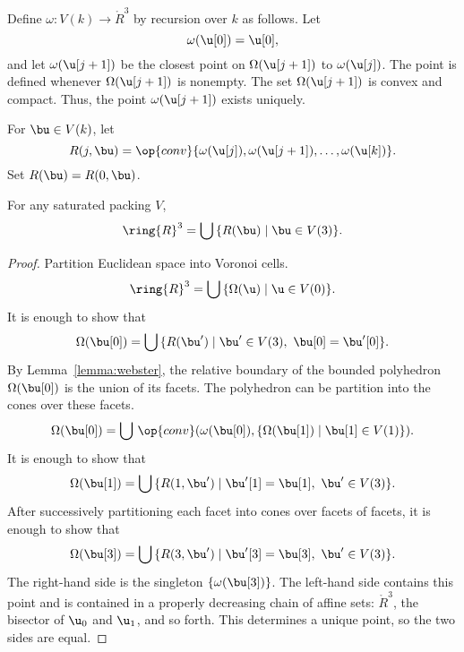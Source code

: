 Define $\omega: V(k)\to \ring{R}^3$ by recursion over $k$ as follows.
Let \begin{displaymath}\omega( \u[0]) = \u[0],\end{displaymath} and
let $\omega( \u[j+1])$ be the closest point on $\Omega( \u[j+1])$ to
$\omega( \u[j])$.  The point is defined whenever $\Omega( \u[j+1])$ is
nonempty.  The set $\Omega( \u[j+1])$ is convex and compact.  Thus,
the point $\omega( \u[j+1])$ exists uniquely.
%

For $\bu\in V(k)$, let 
\begin{displaymath}R(j,\bu) = \op{conv}\{\omega( \u[j]), \omega(
\u[j+1]),\ldots,\omega( \u[k])\}.\end{displaymath} Set
$R(\bu)=R(0,\bu)$.  %


\begin{lemma}
For any saturated packing $ V$, 
\begin{displaymath}\ring{R}^3 = \bigcup\, \{ R(\bu) \mid \bu\in
V(3)\}.\end{displaymath}
\end{lemma}

\begin{proof}
Partition Euclidean space into Voronoi cells. 
\begin{displaymath}\ring{R}^3 = \bigcup\, \{\Omega( \u)\mid \u\in
V(0)\}.\end{displaymath}
It is enough to show that
\begin{displaymath}\Omega(\bu[0]) = \bigcup\, \{ R(\bu') \mid \bu'\in  V(3),~\bu[0]=\bu'[0]\}.\end{displaymath}
By Lemma~\ref{lemma:webster}, the relative boundary of the bounded
polyhedron $\Omega(\bu[0])$ is the union of its facets.  The
polyhedron can be partition into the cones over these facets.
\begin{displaymath}\Omega(\bu[0]) = \bigcup\, \op{conv}(\omega(\bu[0]),\{\Omega(\bu[1])\mid \bu[1]\in  V(1)\}).\end{displaymath}
It is enough to show that
\begin{displaymath}\Omega(\bu[1]) = \bigcup\, \{ R(1,\bu') \mid \bu'[1]=\bu[1],~\bu'\in  V(3)\}.\end{displaymath}
After successively partitioning each facet into cones over facets of
facets, it is enough to show that
\begin{displaymath}\Omega(\bu[3]) = \bigcup\,\{R(3,\bu')\mid\bu'[3]=\bu[3],~\bu'\in V(3)\}.\end{displaymath}
The right-hand side is the singleton $\{\omega(\bu[3])\}$.  The
left-hand side contains this point and is contained in a properly
decreasing chain of affine sets: $\ring{R}^3$, the bisector of $ \u_0$
and $ \u_1$, and so forth.  This determines a unique point, so the two
sides are equal.
\end{proof}

